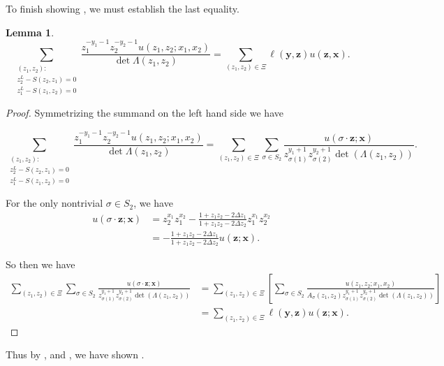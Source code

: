 \documentclass[a4paper,11pt]{article}
\newtheorem{lemma}[theorem]{Lemma}
\theoremstyle{definition}
\begin{document}
To finish showing , we must establish the last equality.
\begin{lemma}\label{l:last Bethe expansion equality}
    \begin{equation}
    \sum_{\substack{(z_1,z_2):\\ z_2^L-S(z_2,z_1)=0\\ z_1^L-S(z_1,z_2)=0}} \frac{z_1^{-y_1-1}z_2^{-y_2-1}u(z_1,z_2;x_1,x_2)}{\det \Lambda(z_1,z_2)} = \sum_{(z_1,z_2)\in\Xi} \ell(\textbf{y},\textbf{z})u(\textbf{z},\textbf{x}).
\end{equation}
\end{lemma}

\begin{proof}
Symmetrizing the summand on the left hand side we have

\begin{equation}
    \sum_{\substack{(z_1,z_2):\\ z_2^L-S(z_2,z_1)=0\\ z_1^L-S(z_1,z_2)=0}} \frac{z_1^{-y_1-1}z_2^{-y_2-1}u(z_1,z_2;x_1,x_2)}{\det \Lambda(z_1,z_2)} = \sum_{(z_1,z_2)\in\Xi} \sum_{\sigma\in S_2} \frac{u(\sigma\cdot\textbf{z};\textbf{x})}{z_{\sigma(1)}^{y_1+1}z_{\sigma(2)}^{y_2+1} \det(\Lambda(z_1,z_2))}.
\end{equation}

For the only nontrivial $\sigma\in S_2$, we have \begin{equation}
\begin{split}
    u(\sigma\cdot\textbf{z};\textbf{x}) &= z_2^{x_1}z_1^{x_2}-\frac{1+z_1z_2-2\Delta z_1}{1+z_1z_2-2\Delta z_2} z_1^{x_1}z_2^{x_2} \\
    &=-\frac{1+z_1z_2-2\Delta z_1}{1+z_1z_2-2\Delta z_2} u(\textbf{z};\textbf{x}).
\end{split}
\end{equation}

So then we have 
\begin{equation}
\begin{split}
    \sum_{(z_1,z_2)\in\Xi} \sum_{\sigma\in S_2} \frac{u(\sigma\cdot\textbf{z};\textbf{x})}{z_{\sigma(1)}^{y_1+1}z_{\sigma(2)}^{y_2+1} \det(\Lambda(z_1,z_2))} &= \sum_{(z_1,z_2)\in\Xi}\left[\sum_{\sigma\in S_2}\frac{u(z_1,z_2;x_1,x_2)}{A_\sigma (z_1,z_2)z_{\sigma(1)}^{y_1+1}z_{\sigma(2)}^{y_2+1} \det(\Lambda(z_1,z_2))}\right] \\
    &= \sum_{(z_1,z_2)\in \Xi} \ell(\textbf{y},\textbf{z})u(\textbf{z};\textbf{x}).
    \end{split}
\end{equation}
\end{proof}
Thus by ,  and , we have shown . 
\end{document}
